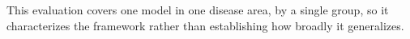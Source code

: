 This evaluation covers one model in one disease area, by a single group, so it characterizes the framework rather than establishing how broadly it generalizes.
